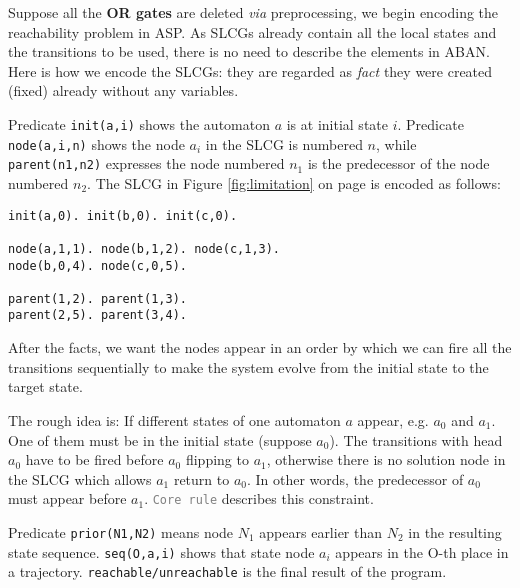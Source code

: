 Suppose all the \textbf{OR gates} are deleted \textit{via} preprocessing, we begin encoding the reachability problem in ASP.
As SLCGs already contain all the local states and the transitions to be used, there is no need to describe the elements in ABAN.
Here is how we encode the SLCGs: they are regarded as \textit{fact} they were created (fixed) already without any variables.

Predicate \texttt{init(a,i)} shows the automaton $a$ is at initial state $i$. %
Predicate \texttt{node(a,i,n)} shows the node $a_i$ in the SLCG is numbered $n$, while \texttt{parent(n1,n2)} expresses the node numbered $n_1$ is the predecessor of the node numbered $n_2$.
The SLCG in Figure \ref{fig:limitation} on page \pageref{fig:limitation} is encoded as follows:
\begin{Verbatim}[commandchars=\\\{\}]
init(a,0). init(b,0). init(c,0).

node(a,1,1). node(b,1,2). node(c,1,3).
node(b,0,4). node(c,0,5).

parent(1,2). parent(1,3).
parent(2,5). parent(3,4).
\end{Verbatim}
After the facts, we want the nodes appear in an order by which we can fire all the transitions sequentially to make the system evolve from the initial state to the target state. 

The rough idea is: If different states of one automaton $a$ appear, e.g. $a_0$ and $a_1$.
One of them must be in the initial state (suppose $a_0$).
The transitions with head $a_0$ have to be fired before $a_0$ flipping to $a_1$, otherwise there is no solution node in the SLCG which allows $a_1$ return to $a_0$.
In other words, the predecessor of $a_0$ must appear before $a_1$. \texttt{\textcolor{gray}{Core rule}} describes this constraint.

Predicate \texttt{prior(N1,N2)} means node $N_1$ appears earlier than $N_2$ in the resulting state sequence.
\texttt{seq(O,a,i)} shows that state node $a_i$ appears in the O-th place in a trajectory.
\texttt{reachable/unreachable} is the final result of the program.

